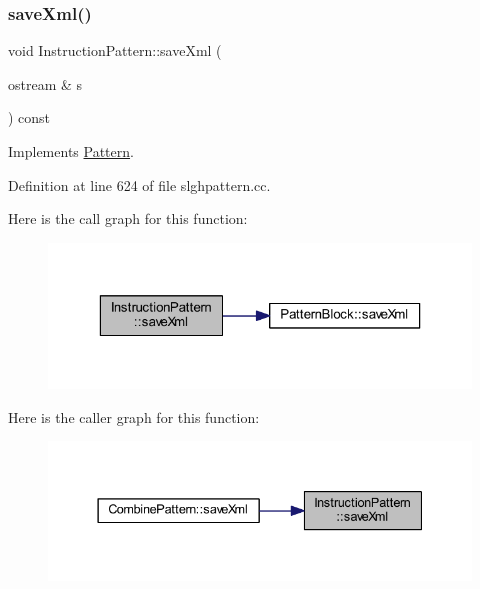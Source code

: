 \subsubsection{\texorpdfstring{saveXml()}{saveXml()}}
{\footnotesize\ttfamily void Instruction\+Pattern\+::save\+Xml (\begin{DoxyParamCaption}\item[{ostream \&}]{s }\end{DoxyParamCaption}) const\hspace{0.3cm}{\ttfamily [virtual]}}



Implements \mbox{\hyperlink{class_pattern_a1ad6c2ad66849318427095662b718fa9}{Pattern}}.



Definition at line 624 of file slghpattern.\+cc.

Here is the call graph for this function\+:
\nopagebreak
\begin{figure}[H]
\begin{center}
\leavevmode
\includegraphics[width=323pt]{class_instruction_pattern_a355f6e3868e5d1e43b324bdad38e27ed_cgraph}
\end{center}
\end{figure}
Here is the caller graph for this function\+:
\nopagebreak
\begin{figure}[H]
\begin{center}
\leavevmode
\includegraphics[width=337pt]{class_instruction_pattern_a355f6e3868e5d1e43b324bdad38e27ed_icgraph}
\end{center}
\end{figure}
\mbox{\label{class_instruction_pattern_a85d29caf8da56fad4bf0805f7fdeb4a8}} 
